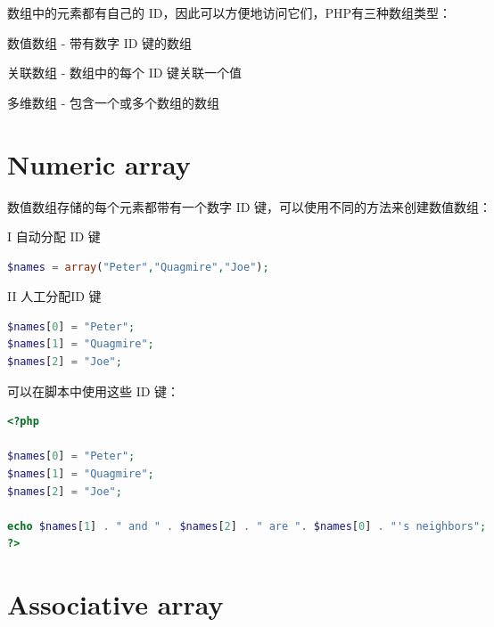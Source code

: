 数组中的元素都有自己的 ID，因此可以方便地访问它们，PHP有三种数组类型：

\begin{compactitem}
\item 数值数组 - 带有数字 ID 键的数组

\item 关联数组 - 数组中的每个 ID 键关联一个值

\item 多维数组 - 包含一个或多个数组的数组
\end{compactitem}






\section{Numeric array}

数值数组存储的每个元素都带有一个数字 ID 键，可以使用不同的方法来创建数值数组：

\begin{compactenum}
\item[I] 自动分配 ID 键

\begin{lstlisting}[language=PHP]
$names = array("Peter","Quagmire","Joe");
\end{lstlisting}

\item[II] 人工分配ID 键

\begin{lstlisting}[language=PHP]
$names[0] = "Peter";
$names[1] = "Quagmire";
$names[2] = "Joe";
\end{lstlisting}

可以在脚本中使用这些 ID 键：


\begin{lstlisting}[language=PHP]
<?php

$names[0] = "Peter";
$names[1] = "Quagmire";
$names[2] = "Joe";

echo $names[1] . " and " . $names[2] . " are ". $names[0] . "'s neighbors";
?>
\end{lstlisting}


\end{compactenum}





\section{Associative array}


